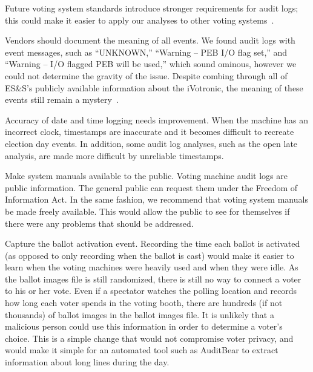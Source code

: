 \documentclass[letterpaper,twocolumn,10pt]{article}
\begin{document}
Future voting system standards introduce stronger
requirements for audit logs; this could make it easier to apply our analyses to
other voting systems~\cite{Wagner2010}.  

Vendors should document the meaning of all events. We found audit logs with
event messages, such as ``UNKNOWN,'' ``Warning – PEB I/O flag set,'' and
``Warning – I/O flagged PEB will be used,'' which sound ominous, however we
could not determine the gravity of the issue. Despite combing through all of
ES\&S’s publicly available information about the iVotronic, the meaning of these
events still remain a mystery~\cite{VerVot2011, ESS2011a, ESS2011b}. 
 
Accuracy of date and time logging needs improvement. When the machine has an
incorrect clock, timestamps are inaccurate and it becomes difficult to recreate
election day events. In addition, some audit log analyses, such as the open late
analysis, are made more difficult by unreliable timestamps. 
 
Make system manuals available to the public. Voting machine audit logs are
public information. The general public can request them under the Freedom of
Information Act. In the same fashion, we recommend that voting system manuals be
made freely available. This would allow the public to see for themselves if
there were any problems that should be addressed.  
 
Capture the ballot activation event. Recording the time each ballot is activated
(as opposed to only recording when the ballot is cast) would make it easier to
learn when the voting machines were heavily used and when they were idle. As the 
ballot images file is still randomized, there is still no way to connect a voter 
to his or her vote.  Even if a spectator watches the polling location and records 
how long each voter spends in the voting booth, there are hundreds (if not thousands) 
of ballot images in the ballot images file.  It is unlikely that a malicious person 
could use this information in order to determine a voter's choice.  This
is a simple change that would not compromise voter privacy, and would make it
simple for an automated tool such as AuditBear to extract information
about long lines during the day.
 
\end{document}
